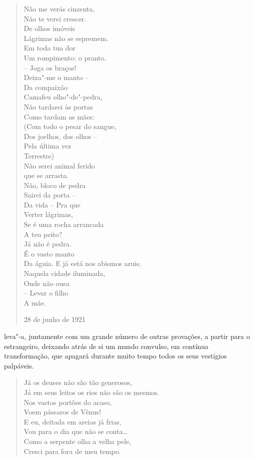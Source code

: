 {{{\begin{verse}
Não me verás cinzenta, \\
Não te verei crescer. \\
De olhos imóveis \\
Lágrimas não se espremem. \\[8pt]
Em toda tua dor \\
Um rompimento: o pranto. \\
-- Joga os braços! \\
Deixa"-me o manto -- \\[8pt]
Da compaixão \\
Camafeu olho"-de"-pedra, \\
Não tardarei às portas \\
Como tardam as mães: \\[8pt]
(Com todo o pesar do sangue, \\
Dos joelhos, dos olhos -- \\
Pela última vez \\
Terrestre) \\
Não serei animal ferido \\
que se arrasta. \\[8pt]
Não, bloco de pedra \\
Sairei da porta -- \\
Da vida -- Pra que \\
Verter lágrimas, \\
Se é uma rocha arrancada \\
A teu peito? \\[8pt]
Já não é pedra. \\
É o vasto manto \\
Da águia. E já está nos abismos azuis. \\
Naquela cidade iluminada, \\
Onde não ousa \\
-- Levar o filho \\
A mãe.

28 de junho de 1921

\end{verse}

leva"-a, juntamente com um grande número de outras provações, a partir
para o estrangeiro, deixando atrás de si um mundo convulso, em contínua
transformação, que apagará durante muito tempo todos os seus vestígios
palpáveis.

\begin{verse}
Já os deuses não são tão generosos, \\
Já em seus leitos os rios não são os mesmos. \\
Nos vastos portões do acaso, \\
Voem pássaros de Vênus! \\[8pt]
E eu, deitada em areias já frias, \\
Vou para o dia que não se conta\ldots{} \\
Como a serpente olha a velha pele, \\
Cresci para fora de meu tempo. 


\end{verse}}}}
